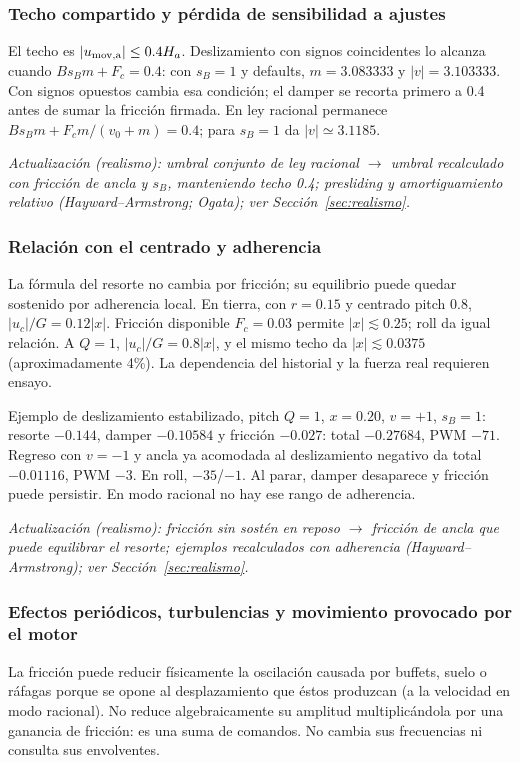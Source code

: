 \documentclass[11pt,a4paper]{article}
\begin{document}
\subsubsection{Techo compartido y pérdida de sensibilidad a ajustes}
El techo es $|u_{\rm mov,a}|\le0.4H_a$. Deslizamiento con signos coincidentes lo alcanza cuando $Bs_Bm+F_c=0.4$: con $s_B=1$ y defaults, $m=3.083333$ y $|v|=3.103333$. Con signos opuestos cambia esa condición; el damper se recorta primero a 0.4 antes de sumar la fricción firmada. En ley racional permanece $Bs_Bm+F_cm/(v_0+m)=0.4$; para $s_B=1$ da $|v|\simeq3.1185$.

\textit{Actualización (realismo): umbral conjunto de ley racional $\rightarrow$ umbral recalculado con fricción de ancla y $s_B$, manteniendo techo 0.4; presliding y amortiguamiento relativo (Hayward--Armstrong; Ogata); ver Sección~\ref{sec:realismo}.}

\subsubsection{Relación con el centrado y adherencia}
La fórmula del resorte no cambia por fricción; su equilibrio puede quedar sostenido por adherencia local. En tierra, con $r=0.15$ y centrado pitch 0.8, $|u_c|/G=0.12|x|$. Fricción disponible $F_c=0.03$ permite $|x|\lesssim0.25$; roll da igual relación. A $Q=1$, $|u_c|/G=0.8|x|$, y el mismo techo da $|x|\lesssim0.0375$ (aproximadamente 4\%). La dependencia del historial y la fuerza real requieren ensayo.

Ejemplo de deslizamiento estabilizado, pitch $Q=1$, $x=0.20$, $v=+1$, $s_B=1$: resorte $-0.144$, damper $-0.10584$ y fricción $-0.027$: total $-0.27684$, PWM $-71$. Regreso con $v=-1$ y ancla ya acomodada al deslizamiento negativo da total $-0.01116$, PWM $-3$. En roll, $-35$/$-1$. Al parar, damper desaparece y fricción puede persistir. En modo racional no hay ese rango de adherencia.

\textit{Actualización (realismo): fricción sin sostén en reposo $\rightarrow$ fricción de ancla que puede equilibrar el resorte; ejemplos recalculados con adherencia (Hayward--Armstrong); ver Sección~\ref{sec:realismo}.}

\subsubsection{Efectos periódicos, turbulencias y movimiento provocado por el motor}
La fricción puede reducir físicamente la oscilación causada por buffets, suelo o ráfagas porque se opone al desplazamiento que éstos produzcan (a la velocidad en modo racional). No reduce algebraicamente su amplitud multiplicándola por una ganancia de fricción: es una suma de comandos. No cambia sus frecuencias ni consulta sus envolventes.
\end{document}
